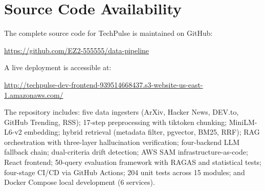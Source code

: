 \appendix

\chapter{Source Code Availability}

The complete source code for TechPulse is maintained on GitHub:

\begin{center}
\url{https://github.com/EZ2-555555/data-pipeline}
\end{center}

\noindent A live deployment is accessible at:

\begin{center}
\url{http://techpulse-dev-frontend-939514668437.s3-website-us-east-1.amazonaws.com/}
\end{center}

The repository includes: five data ingesters (ArXiv, Hacker News, DEV.to, GitHub Trending, RSS); 17-step preprocessing with tiktoken chunking; MiniLM-L6-v2 embedding; hybrid retrieval (metadata filter, pgvector, BM25, RRF); RAG orchestration with three-layer hallucination verification; four-backend LLM fallback chain; dual-criteria drift detection; AWS SAM infrastructure-as-code; React frontend; 50-query evaluation framework with RAGAS and statistical tests; four-stage CI/CD via GitHub Actions; 204 unit tests across 15 modules; and Docker Compose local development (6 services).

